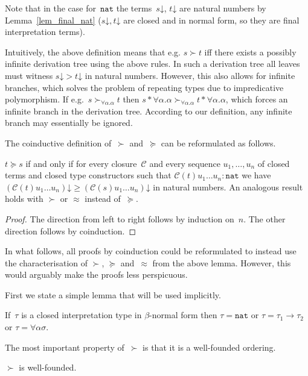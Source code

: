 \documentclass[a4paper,UKenglish,cleveref,autoref,numberwithinsect]{lipics-v2019}
\theoremstyle{definition}
\newcommand{\arrtype}{\rightarrow}
\newcommand{\tapp}[2]{#1 * #2}
\newcommand{\nat}{\mathtt{nat}}
\newcommand{\cl}{\mathcal{C}}
\newcommand{\da}{\mathord{\downarrow}}
\begin{document}
Note that in the case for~$\nat$ the terms~$s\da$, $t\da$ are natural
numbers by Lemma~\ref{lem_final_nat} ($s\da,t\da$ are closed and in
normal form, so they are final interpretation terms).

Intuitively, the above definition means that e.g. $s \succ t$ iff
there exists a possibly infinite derivation tree using the above
rules. In such a derivation tree all leaves must witness $s\da > t\da$
in natural numbers. However, this also allows for infinite branches,
which solves the problem of repeating types due to impredicative
polymorphism. If e.g.~$s \succ_{\forall \alpha . \alpha} t$ then
$\tapp{s}{\forall\alpha.\alpha} \succ_{\forall \alpha . \alpha}
\tapp{t}{\forall\alpha.\alpha}$, which forces an infinite branch in
the derivation tree. According to our definition, any infinite branch
may essentially be ignored.

The coinductive definition of~$\succ$ and~$\succeq$ can be
reformulated as follows.

\begin{lemma}
  $t \succeq s$ if and only if for every closure~$\cl$ and every
  sequence $u_1,\ldots,u_n$ of closed terms and closed type
  constructors such that $\cl(t) u_1 \ldots u_n : \nat$ we have
  $(\cl(t) u_1 \ldots u_n)\da \ge (\cl(s) u_1 \ldots u_n)\da$ in
  natural numbers. An analogous result holds with $\succ$ or $\approx$
  instead of~$\succeq$.
\end{lemma}

\begin{proof}
  The direction from left to right follows by induction on~$n$. The
  other direction follows by coinduction.
\end{proof}

In what follows, all proofs by coinduction could be reformulated to
instead use the characterisation of $\succ$, $\succeq$ and~$\approx$
from the above lemma. However, this would arguably make the proofs
less perspicuous.

First we state a simple lemma that will be used implicitly.

\begin{lemma}
  If~$\tau$ is a closed interpretation type in $\beta$-normal form
  then $\tau = \nat$ or $\tau = \tau_1\arrtype\tau_2$ or $\tau =
  \forall\alpha\sigma$.
\end{lemma}

The most important property of~$\succ$ is that it is a well-founded
ordering.

\begin{lemma}\label{lem_well_founded}
  $\succ$ is well-founded.
\end{lemma}
\end{document}
